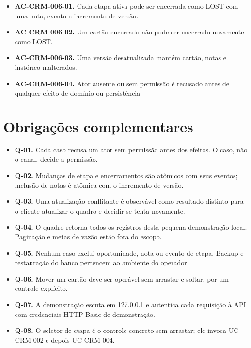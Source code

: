 \documentclass[10pt,a4paper]{article}
\begin{document}
\begin{itemize}

\item \textbf{AC-CRM-006-01.} Cada etapa ativa pode ser encerrada como LOST com uma nota, evento e incremento de versão.

\item \textbf{AC-CRM-006-02.} Um cartão encerrado não pode ser encerrado novamente como LOST.

\item \textbf{AC-CRM-006-03.} Uma versão desatualizada mantém cartão, notas e histórico inalterados.

\item \textbf{AC-CRM-006-04.} Ator ausente ou sem permissão é recusado antes de qualquer efeito de domínio ou persistência.

\end{itemize}

\section{Obrigações complementares}

\begin{itemize}

\item \textbf{Q-01.} Cada caso recusa um ator sem permissão antes dos efeitos. O caso, não o canal, decide a permissão.

\item \textbf{Q-02.} Mudanças de etapa e encerramentos são atômicos com seus eventos; inclusão de notas é atômica com o incremento de versão.

\item \textbf{Q-03.} Uma atualização conflitante é observável como resultado distinto para o cliente atualizar o quadro e decidir se tenta novamente.

\item \textbf{Q-04.} O quadro retorna todos os registros desta pequena demonstração local. Paginação e metas de vazão estão fora do escopo.

\item \textbf{Q-05.} Nenhum caso exclui oportunidade, nota ou evento de etapa. Backup e restauração do banco pertencem ao ambiente do operador.

\item \textbf{Q-06.} Mover um cartão deve ser operável sem arrastar e soltar, por um controle explícito.

\item \textbf{Q-07.} A demonstração escuta em 127.0.0.1 e autentica cada requisição à API com credenciais HTTP Basic de demonstração.

\item \textbf{Q-08.} O seletor de etapa é o controle concreto sem arrastar; ele invoca UC-CRM-002 e depois UC-CRM-004.

\end{itemize}
\end{document}
